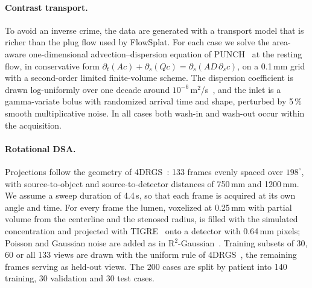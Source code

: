 
\paragraph{Contrast transport.}
To avoid an inverse crime, the data are generated with a transport model
that is richer than the plug flow used by FlowSplat. For each case we solve
the area-aware one-dimensional advection--dispersion equation of
PUNCH~\cite{thakur2026punch} at the resting flow, in conservative form
$\partial_t(Ac) + \partial_s(Qc) = \partial_s(AD\,\partial_s c)$, on a
0.1\,mm grid with a second-order limited finite-volume scheme. The
dispersion coefficient is drawn log-uniformly over one decade around
$10^{-6}$\,m$^2$/s~\cite{thakur2026punch}, and the inlet is a gamma-variate
bolus with randomized arrival time and shape, perturbed by 5\,\% smooth
multiplicative noise. In all cases both wash-in and wash-out occur within
the acquisition.

\paragraph{Rotational DSA.}
Projections follow the geometry of 4DRGS~\cite{liu2025fourdrgs}: 133
frames evenly spaced over $198^\circ$, with source-to-object and
source-to-detector distances of 750\,mm and 1200\,mm. We assume a sweep
duration of 4.4\,s, so that each frame is acquired at its own angle and
time. For every frame the lumen,
voxelized at 0.25\,mm with partial volume from the centerline and the
stenosed radius, is filled with the simulated concentration and projected
with TIGRE~\cite{biguri2016tigre} onto a detector with 0.64\,mm pixels;
Poisson and Gaussian noise are added as in
R$^2$-Gaussian~\cite{zha2024r2gaussian}. Training subsets of 30, 60 or all
133 views are drawn with the uniform rule of 4DRGS~\cite{liu2025fourdrgs},
the remaining frames serving as held-out views. The 200 cases are split by patient into 140 training, 30
validation and 30 test cases.
